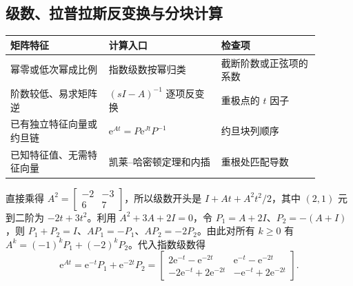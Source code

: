\subsection{级数、拉普拉斯反变换与分块计算}

\begin{center}
\small
\begin{tabular}{p{0.28\linewidth}p{0.32\linewidth}p{0.29\linewidth}}
\toprule
矩阵特征 & 计算入口 & 检查项\\
\midrule
幂零或低次幂成比例 & 指数级数按幂归类 & 截断阶数或正弦项的系数\\
阶数较低、易求矩阵逆 & $(sI-A)^{-1}$ 逐项反变换 & 重极点的 $t$ 因子\\
已有独立特征向量或约旦链 & $\mathrm e^{At}=P\mathrm e^{Jt}P^{-1}$ & 约旦块列顺序\\
已知特征值、无需特征向量 & 凯莱--哈密顿定理和内插 & 重根处匹配导数\\
\bottomrule
\end{tabular}
\end{center}



\sol 直接乘得 $A^2=\begin{bmatrix}-2&-3\\6&7\end{bmatrix}$，所以级数开头是 $I+At+A^2t^2/2$，其中 $(2,1)$ 元到二阶为 $-2t+3t^2$。利用 $A^2+3A+2I=0$，令 $P_1=A+2I$、$P_2=-(A+I)$，则
$P_1+P_2=I$、$AP_1=-P_1$、$AP_2=-2P_2$。由此对所有 $k\geq0$ 有 $A^k=(-1)^kP_1+(-2)^kP_2$。代入指数级数得
\[
\mathrm e^{At}=\mathrm e^{-t}P_1+\mathrm e^{-2t}P_2=
\begin{bmatrix}
2\mathrm e^{-t}-\mathrm e^{-2t}&\mathrm e^{-t}-\mathrm e^{-2t}\\
-2\mathrm e^{-t}+2\mathrm e^{-2t}&-\mathrm e^{-t}+2\mathrm e^{-2t}
\end{bmatrix}.
\]


